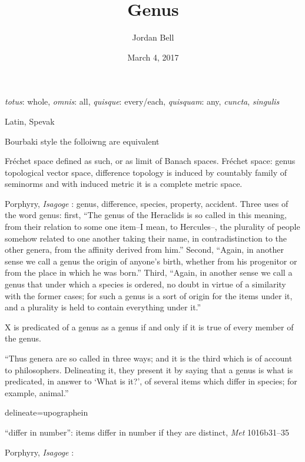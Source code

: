 \documentclass{article}
\begin{document}
\title{Genus}
\author{Jordan Bell}
\date{March 4, 2017}

\maketitle

{\em totus}: whole, {\em omnis}: all, {\em quisque}: every/each, {\em quisquam}: any, {\em cuncta}, {\em singulis}


Latin, Spevak \cite{spevak}

Bourbaki style the folloiwng are equivalent

Fr\'echet space defined as such, or as limit of Banach spaces. Fr\'echet space: genus topological vector space, difference 
topology is induced by countably family of seminorms and with induced metric it is a complete metric space.

Porphyry, {\em Isagoge}  \cite{isagoge}: 
genus, difference, species, property, accident.
Three uses of the word genus: first, ``The genus of the Heraclids is so called in this meaning, from their relation to some one item--I mean, to Hercules--, the plurality of people somehow related to one another taking their name, in contradistinction to the other genera, from the affinity derived from him.'' \cite[p.~3, \S 1]{isagoge}
Second, ``Again, in another sense we call a genus the origin of anyone's birth, whether from his progenitor or from the place in which he was born.''
Third, ``Again, in another sense we call a genus that under which a species is ordered, no doubt in virtue of a similarity with the former cases; for such a genus is a sort of origin for the items under it, and a plurality is held to contain everything under it.'' \cite[p.~4, \S 1]{isagoge}

X is predicated of a genus as a genus if and only if it is true of every member of the genus. 

``Thus genera are so called in three ways; and it is the third which is of account to philosophers. Delineating it, they present it by saying that a genus is what is predicated, in answer to `What is it?', of several items which differ in species; for example, animal.'' \cite[p.~4, \S 1]{isagoge}

delineate=upographein

``differ in number'': items differ in number if they are distinct, {\em Met} 1016b31--35

Porphyry, {\em Isagoge} \cite[pp.~4--5, \S 2]{isagoge}:
\end{document}
